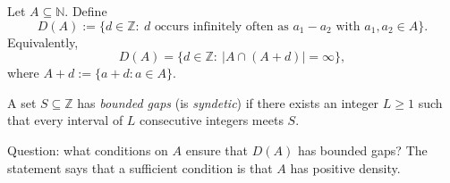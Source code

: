Let $A\subseteq\mathbb N$.
Define
\[
D(A):=\{d\in\mathbb Z:\ d\text{ occurs infinitely often as }a_1-a_2\text{ with }a_1,a_2\in A\}.
\]
Equivalently,
\[
D(A)=\{d\in\mathbb Z:\ |A\cap(A+d)|=\infty\},
\]
where $A+d:=\{a+d: a\in A\}$.

A set $S\subseteq\mathbb Z$ has \emph{bounded gaps} (is \emph{syndetic}) if there exists an integer $L\ge 1$ such that every interval of $L$ consecutive integers meets $S$.

Question: what conditions on $A$ ensure that $D(A)$ has bounded gaps?
The statement says that a sufficient condition is that $A$ has positive density.
